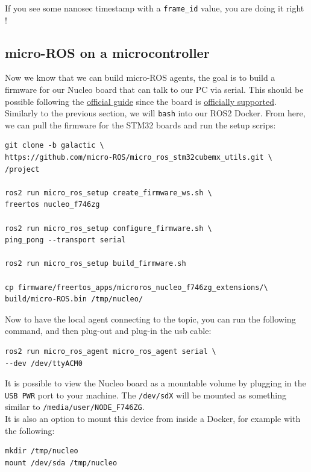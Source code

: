 \documentclass[10pt]{article}
\begin{document}
If you see some nanosec timestamp with a \verb|frame_id| value, you are doing it right !

\subsection{micro-ROS on a microcontroller}
\label{sec:micro-ros-micr}
Now we know that we can build micro-ROS agents, the goal is to build a firmware for our Nucleo board that can talk to our PC via serial.
This should be possible following the \href{https://micro.ros.org/docs/tutorials/core/first_application_rtos/freertos/}{official guide} since the board is \href{https://micro.ros.org/docs/overview/hardware/}{officially supported}.\\


Similarly to the previous section, we will \verb|bash| into our ROS2 Docker. From here, we can  pull the firmware for the STM32 boards and run the setup scrips:
\begin{tcolorbox}
\begin{verbatim}
git clone -b galactic \
https://github.com/micro-ROS/micro_ros_stm32cubemx_utils.git \
/project

ros2 run micro_ros_setup create_firmware_ws.sh \
freertos nucleo_f746zg

ros2 run micro_ros_setup configure_firmware.sh \
ping_pong --transport serial

ros2 run micro_ros_setup build_firmware.sh

cp firmware/freertos_apps/microros_nucleo_f746zg_extensions/\
build/micro-ROS.bin /tmp/nucleo/
\end{verbatim}
\end{tcolorbox}

Now to have the local agent connecting to the topic, you can run the following command, and then plug-out and plug-in the usb cable:
\begin{tcolorbox}
\begin{verbatim}
ros2 run micro_ros_agent micro_ros_agent serial \
--dev /dev/ttyACM0
\end{verbatim}
\end{tcolorbox}

It is possible to view the Nucleo board as a mountable volume by plugging in the \verb|USB PWR| port to your machine. The \verb|/dev/sdX| will be mounted as something similar to \verb|/media/user/NODE_F746ZG|.\\
It is also an option to mount this device from inside a Docker, for example with the following:
\begin{tcolorbox}
\begin{verbatim}
mkdir /tmp/nucleo
mount /dev/sda /tmp/nucleo
\end{verbatim}
\end{tcolorbox}
\end{document}
